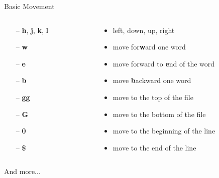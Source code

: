 \documentclass{beamer}
\begin{document}
\begin{frame}{Basic Movement}
    \begin{columns}
        \begin{column}{0.2\textwidth}
            \begin{itemize}
                \item[--] \textbf{h}, \textbf{j}, \textbf{k}, \textbf{l}
                \item[--] \textbf{w}
                \item[--] \textbf{e}
                \item[--] \textbf{b}
                \item[--] \textbf{gg}
                \item[--] \textbf{G}
                \item[--] \textbf{0}
                \item[--] \textbf{\$}
            \end{itemize}
        \end{column}
        \begin{column}{0.8\textwidth}
            \begin{itemize}
                \item left, down, up, right
                \item move for\textbf{w}ard one word
                \item move forward to \textbf{e}nd of the word
                \item move \textbf{b}ackward one word
                \item move to the top of the file
                \item move to the bottom of the file
                \item move to the beginning of the line
                \item move to the end of the line
            \end{itemize}
        \end{column}
    \end{columns}
    \begin{center}
        \large And more...
    \end{center}
\end{frame}
\end{document}
